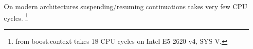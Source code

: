 
On modern architectures suspending/resuming continuations takes very few CPU cycles.
\footnote{ from boost.context takes 18 CPU cycles on Intel E5 2620 v4,
SYS V.}
